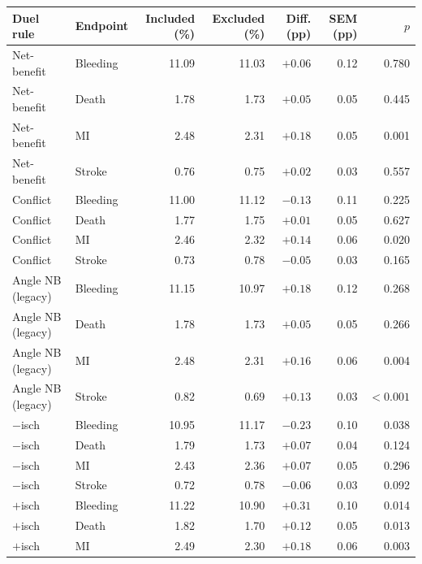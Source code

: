 \begin{table}[htbp]
    \centering
    \small
    \setlength{\tabcolsep}{5pt}
    \begin{tabular}{llrrrrr}
        \toprule
        Duel rule & Endpoint & Included (\%) & Excluded (\%) & Diff. (pp) & SEM (pp) & $p$ \\
        \midrule
        Net-benefit    & Bleeding & 11.09 & 11.03 & $+0.06$ & 0.12 & 0.780 \\
        Net-benefit    & Death    & 1.78  & 1.73  & $+0.05$ & 0.05 & 0.445 \\
        Net-benefit    & MI       & 2.48  & 2.31  & $+0.18$ & 0.05 & 0.001 \\
        Net-benefit    & Stroke   & 0.76  & 0.75  & $+0.02$ & 0.03 & 0.557 \\
        \midrule
        Conflict & Bleeding & 11.00 & 11.12 & $-0.13$ & 0.11 & 0.225 \\
        Conflict & Death    & 1.77  & 1.75  & $+0.01$ & 0.05 & 0.627 \\
        Conflict & MI       & 2.46  & 2.32  & $+0.14$ & 0.06 & 0.020 \\
        Conflict & Stroke   & 0.73  & 0.78  & $-0.05$ & 0.03 & 0.165 \\
        \midrule
        Angle NB (legacy) & Bleeding & 11.15 & 10.97 & $+0.18$ & 0.12 & 0.268 \\
        Angle NB (legacy) & Death    & 1.78  & 1.73  & $+0.05$ & 0.05 & 0.266 \\
        Angle NB (legacy) & MI       & 2.48  & 2.31  & $+0.16$ & 0.06 & 0.004 \\
        Angle NB (legacy) & Stroke   & 0.82  & 0.69  & $+0.13$ & 0.03 & $<0.001$ \\
        \midrule
        $-$isch     & Bleeding & 10.95 & 11.17 & $-0.23$ & 0.10 & 0.038 \\
        $-$isch     & Death    & 1.79  & 1.73  & $+0.07$ & 0.04 & 0.124 \\
        $-$isch     & MI       & 2.43  & 2.36  & $+0.07$ & 0.05 & 0.296 \\
        $-$isch     & Stroke   & 0.72  & 0.78  & $-0.06$ & 0.03 & 0.092 \\
        \midrule
        $+$isch     & Bleeding & 11.22 & 10.90 & $+0.31$ & 0.10 & 0.014 \\
        $+$isch     & Death    & 1.82  & 1.70  & $+0.12$ & 0.05 & 0.013 \\
        $+$isch     & MI       & 2.49  & 2.30  & $+0.18$ & 0.06 & 0.003 \\

\end{tabular}
\end{table}
